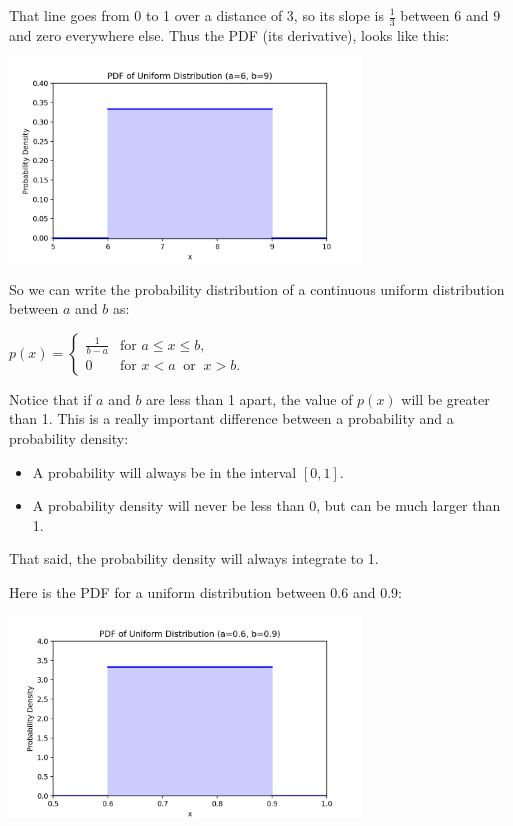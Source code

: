 That line goes from 0 to 1 over a distance of 3,   so its slope is $\frac{1}{3}$ between 6 and  9 and zero everywhere else.   Thus the PDF (its derivative),  looks like this:

\includegraphics[width=0.7\textwidth]{unif_pdf.png}

So we can write the probability distribution of a continuous uniform distribution between $a$ and $b$ as:

  $p(x) = \begin{cases}
  \frac{1}{b-a} & \text{for } a \le x \le b, \\[8pt]
  0 & \text{for } x < a \ \text{ or } \ x > b.
  \end{cases}$

Notice that if $a$ and $b$ are less than 1 apart,  the value of $p(x)$ will be greater than 1.  This is a really important difference between a probability and a probability density: 
\begin{itemize}
\item A probability will always be in  the interval $[0, 1]$.  
\item A probability density will never be less than 0,  but can be much larger than 1.
\end{itemize}

That said,  the probability density will always integrate to 1.

Here is the PDF for a uniform distribution between 0.6 and 0.9:

\includegraphics[width=0.7\textwidth]{unif_pdf2.png}

